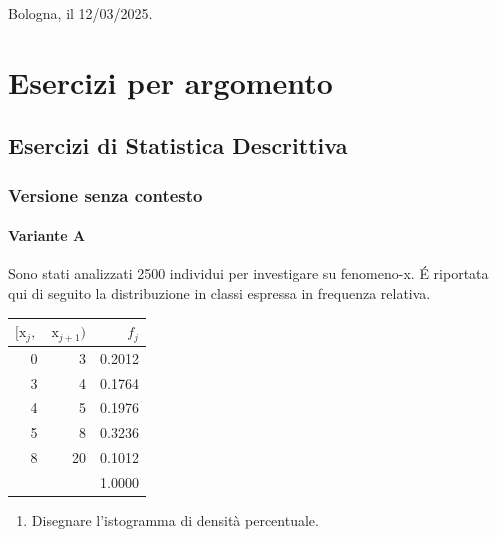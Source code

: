 \documentclass[
  11pt,
]{book}
\providecommand{\tightlist}{%
  \setlength{\itemsep}{0pt}\setlength{\parskip}{0pt}}
\theoremstyle{mytheoremstyle}
\theoremstyle{mydefstyle}
\begin{document}
Bologna, il 12/03/2025.

\part{Esercizi per argomento}

\chapter{Esercizi di Statistica Descrittiva}\label{esercizi-di-statistica-descrittiva}

\section{Versione senza contesto}\label{versione-senza-contesto}

\subsection{Variante A}\label{variante-a}

Sono stati analizzati 2500 individui per investigare su fenomeno-x. É riportata qui di seguito la distribuzione in classi espressa in frequenza relativa.

\begin{tabular}{rrr}
\toprule
$[\text{x}_j,$ & $\text{x}_{j+1})$ & $f_j$\\
\midrule
0 & 3 & 0.2012\\
3 & 4 & 0.1764\\
4 & 5 & 0.1976\\
5 & 8 & 0.3236\\
8 & 20 & 0.1012\\
 &  & 1.0000\\
\bottomrule
\end{tabular}

\begin{enumerate}
\def\labelenumi{\alph{enumi}.}
\tightlist
\item
  Disegnare l'istogramma di densità percentuale.
\end{enumerate}
\end{document}
